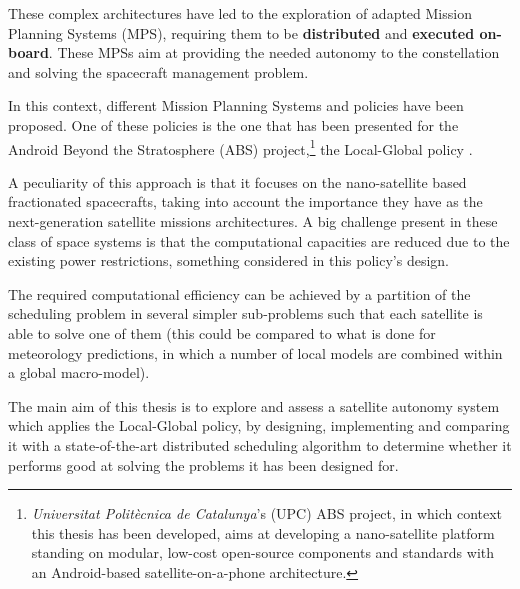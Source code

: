 These complex architectures have led to the exploration of adapted Mission Planning Systems (MPS), requiring them to be \textbf{distributed} and \textbf{executed on-board}. These MPSs aim at providing the needed autonomy to the constellation and solving the spacecraft management problem.

In this context, different Mission Planning Systems and policies have been proposed. One of these policies is the one that has been presented for the Android Beyond the Stratosphere (ABS) project,\footnote{\emph{Universitat Polit\`ecnica de Catalunya}'s (UPC) ABS project, in which context this thesis has been developed, aims at developing a nano-satellite platform standing on modular, low-cost open-source components and standards with an Android-based satellite-on-a-phone architecture.} the Local-Global policy \cite{Araguz15}.

A peculiarity of this approach is that it focuses on the nano-satellite based fractionated spacecrafts, taking into account the importance they have as the next-generation satellite missions architectures. A big challenge present in these class of space systems is that the computational capacities are reduced due to the existing power restrictions, something considered in this policy's design.

The required computational efficiency can be achieved by a partition of the scheduling problem in several simpler sub-problems such that each satellite is able to solve one of them (this could be compared to what is done for meteorology predictions, in which a number of local models are combined within a global macro-model).

The main aim of this thesis is to explore and assess a satellite autonomy system which applies the Local-Global policy, by designing, implementing and comparing it with a state-of-the-art distributed scheduling algorithm to determine whether it performs good at solving the problems it has been designed for.

